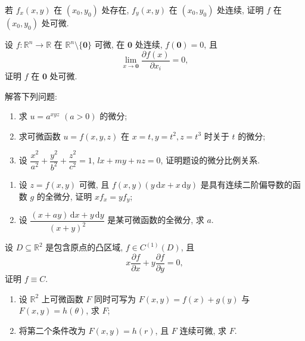 \documentclass[../数学分析培优讲义.tex]{subfiles}
\begin{document}
\begin{example}
若 $f_x(x,y)$ 在 $(x_0,y_0)$ 处存在, $f_y(x,y)$ 在 $(x_0,y_0)$ 处连续, 证明 $f$ 在 $(x_0,y_0)$ 处可微.
\end{example}
\exampleblank

\begin{example}
设 $f:\mathbb{R}^n\to\mathbb{R}$ 在 $\mathbb{R}^n\setminus\{\bm{0}\}$ 可微, 在 $\bm{0}$ 处连续, $f(\bm{0})=0$, 且
\[
    \lim\limits_{x\to\bm{0}}\dfrac{\partial f(x)}{\partial x_i}=0,
\]
证明 $f$ 在 $\bm{0}$ 处可微.
\end{example}
\exampleblank

\begin{example}
解答下列问题:
\begin{enumerate}[label=(\arabic*)]
    \item 求 $u=a^{xyz}$ $(a>0)$ 的微分;
    \item 求可微函数 $u=f(x,y,z)$ 在 $x=t,y=t^2,z=t^3$ 时关于 $t$ 的微分;
    \item 设 $\dfrac{x^2}{a^2}+\dfrac{y^2}{b^2}+\dfrac{z^2}{c^2}=1$, $lx+my+nz=0$, 证明题设的微分比例关系.
\end{enumerate}
\end{example}
\exampleblank

\begin{example}
\begin{enumerate}[label=(\arabic*)]
    \item 设 $z=f(x,y)$ 可微, 且 $f(x,y)(y\,\mathrm{d}x+x\,\mathrm{d}y)$ 是具有连续二阶偏导数的函数 $g$ 的全微分, 证明 $xf_x=yf_y$;
    \item 设 $\displaystyle\dfrac{(x+ay)\,\mathrm{d}x+y\,\mathrm{d}y}{(x+y)^2}$ 是某可微函数的全微分, 求 $a$.
\end{enumerate}
\end{example}
\exampleblank

\begin{example}
设 $D\subseteq\mathbb{R}^2$ 是包含原点的凸区域, $f\in C^{(1)}(D)$, 且
\[
    x\dfrac{\partial f}{\partial x}+y\dfrac{\partial f}{\partial y}=0,
\]
证明 $f\equiv C$.
\end{example}
\exampleblank

\begin{example}
\begin{enumerate}[label=(\arabic*)]
    \item 设 $\mathbb{R}^2$ 上可微函数 $F$ 同时可写为 $F(x,y)=f(x)+g(y)$ 与 $F(x,y)=h(\theta)$, 求 $F$;
    \item 将第二个条件改为 $F(x,y)=h(r)$, 且 $F$ 连续可微, 求 $F$.
\end{enumerate}
\end{example}
\exampleblank
\end{document}
